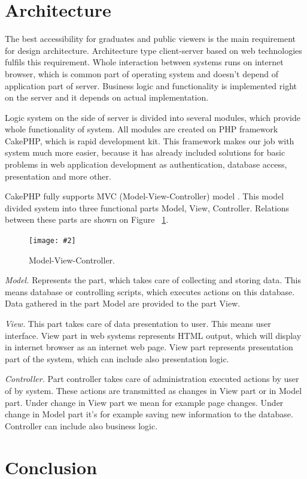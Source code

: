 \documentclass{iitsrc}[2006/14/02]
\newcommand\fig[4]{%
	\begin{figure}[h]
	\begin{center}
	\texttt{[image: \#2]}
	~\\%
	\caption{#4}
	\label{#3}
	\end{center}
	\end{figure}
}
\begin{document}
\section{Architecture}

The best accessibility for graduates and public viewers is the main requirement for design architecture. Architecture type client-server based on web technologies fulfils this requirement. Whole interaction between systems runs on internet browser, which is common part of operating system and doesn’t depend of application part of server. Business logic and functionality is implemented right on the server and it depends on actual implementation.

Logic system on the side of server is divided into several modules, which provide whole functionality of system. All modules are created on PHP framework CakePHP, which is rapid development kit. This framework makes our job with system much more easier, because it has already included solutions for basic problems in web application development as authentication, database access, presentation and more other.

CakePHP fully supports MVC (Model-View-Controller) model \cite{cakephp}. This model divided system into three functional parts Model, View, Controller. Relations between these parts are shown on Figure ~\ref{fig:mvc}. 

\fig{width=7cm}{images/mvc}{fig:mvc}{Model-View-Controller.}

{\em Model.} Represents the part, which takes care of collecting and storing data. This means database or controlling scripts, which executes actions on this database. Data gathered in the part Model are provided to the part View.

{\em View.} This part takes care of data presentation to user. This means user interface. View part in web systems represents HTML output, which will display in internet browser as an internet web page. View part represents presentation part of the system, which can include also presentation logic.

{\em Controller.} Part controller takes care of administration executed actions by user of by system. These actions are transmitted as changes in View part or in Model part. Under change in View part we mean for example page changes. Under change in Model part it’s for example saving new information to the database. Controller can include also business logic.
      
\section{Conclusion}
\end{document}
